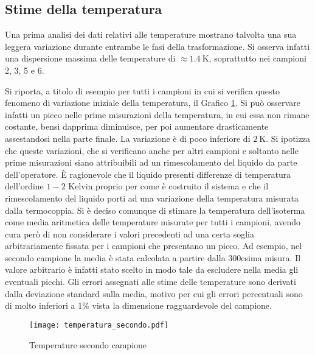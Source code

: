 \documentclass[a4paper,11pt,oneside]{article}
\begin{document}




\subsection{Stime della temperatura}
Una prima analisi dei dati relativi alle temperature mostrano talvolta una sua leggera variazione durante entrambe le fasi della trasformazione. Si osserva infatti una dispersione massima delle temperature di $\approx \SI{1.4}{\kelvin}$, soprattutto nei campioni 2, 3, 5 e 6. 

Si riporta, a titolo di esempio per tutti i campioni in cui si verifica questo fenomeno di variazione iniziale della temperatura, il Grafico \ref{fig:campione_temperatura}. Si può osservare infatti un picco nelle prime misurazioni della temperatura, in cui essa non rimane costante, bensì dapprima diminuisce, per poi aumentare drasticamente assestandosi nella parte finale. La variazione è di poco inferiore di $\SI{2}{\kelvin}$.
Si ipotizza che queste variazioni, che si verificano anche per altri campioni e soltanto nelle prime misurazioni siano attribuibili ad un rimescolamento del liquido da parte dell'operatore. È ragionevole che il liquido presenti differenze di temperatura dell'ordine $1-2$ Kelvin proprio per come è costruito il sistema e che il rimescolamento del liquido porti ad una variazione della temperatura misurata dalla termocoppia. 
Si è deciso comunque di stimare la temperatura dell'isoterma come media aritmetica delle temperature misurate per tutti i campioni, avendo cura però di non considerare i valori precedenti ad una certa soglia arbitrariamente fissata per i campioni che presentano un picco. Ad esempio, nel secondo campione la media è stata calcolata a partire dalla 300esima misura. Il valore arbitrario è infatti stato scelto in modo tale da escludere nella media gli eventuali picchi.  Gli errori assegnati alle stime delle temperature sono derivati dalla deviazione standard sulla media, motivo per cui gli errori percentuali sono di molto inferiori a 1\% vista la dimensione ragguardevole del campione.\newline

\begin{figure}[h!]
    \centering
    \texttt{[image: temperatura\_secondo.pdf]}
    \caption{Temperature secondo campione}
    \label{fig:campione_temperatura}
\end{figure}
\end{document}
